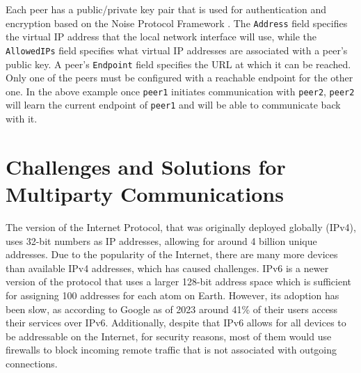 \begin{Shaded}
\begin{Highlighting}[]
\KeywordTok{[Interface]}
\OtherTok{=}
\OtherTok{=}\StringTok{ }
\OtherTok{=}

\KeywordTok{[Peer]}
\OtherTok{=}
\OtherTok{=}
\end{Highlighting}
\end{Shaded}

Each peer has a public/private key pair that is used for authentication
and encryption based on the Noise Protocol Framework
\autocite{noiseDocs}. The \texttt{Address} field specifies the virtual
IP address that the local network interface will use, while the
\texttt{AllowedIPs} field specifies what virtual IP addresses are
associated with a peer's public key. A peer's \texttt{Endpoint} field
specifies the URL at which it can be reached. Only one of the peers must
be configured with a reachable endpoint for the other one. In the above
example once \texttt{peer1} initiates communication with \texttt{peer2},
\texttt{peer2} will learn the current endpoint of \texttt{peer1} and
will be able to communicate back with it.


\hypertarget{challenges-and-solutions-for-multiparty-communications}{%
\section{Challenges and Solutions for Multiparty
Communications}\label{challenges-and-solutions-for-multiparty-communications}}

The version of the Internet Protocol, that was originally deployed
globally (IPv4), uses 32-bit numbers as IP addresses, allowing for
around 4 billion unique addresses. Due to the popularity of the
Internet, there are many more devices than available IPv4 addresses,
which has caused challenges. IPv6 is a newer version of the protocol
that uses a larger 128-bit address space which is sufficient for
assigning 100 addresses for each atom on Earth. However, its adoption
has been slow, as according to Google\autocite{IPv6Google} as of 2023
around 41\% of their users access their services over IPv6.
Additionally, despite that IPv6 allows for all devices to be addressable
on the Internet, for security reasons, most of them would use firewalls
to block incoming remote traffic that is not associated with outgoing
connections.

